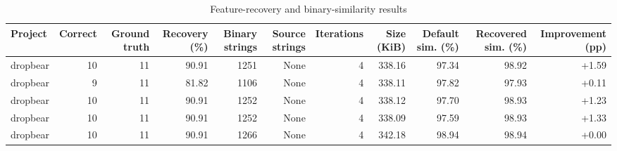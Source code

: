 \begin{table}[htbp]
\centering
\caption{Feature-recovery and binary-similarity results}
\label{tab:feature-recovery-results}
\small
\begin{tabular}{lrrrrrrrrrr}
\toprule
Project & Correct & Ground truth & Recovery (\%) & Binary strings & Source strings & Iterations & Size (KiB) & Default sim. (\%) & Recovered sim. (\%) & Improvement (pp) \\
\midrule
dropbear & 10 & 11 & 90.91 & 1251 & None & 4 & 338.16 & 97.34 & 98.92 & +1.59 \\
dropbear & 9 & 11 & 81.82 & 1106 & None & 4 & 338.11 & 97.82 & 97.93 & +0.11 \\
dropbear & 10 & 11 & 90.91 & 1252 & None & 4 & 338.12 & 97.70 & 98.93 & +1.23 \\
dropbear & 10 & 11 & 90.91 & 1252 & None & 4 & 338.09 & 97.59 & 98.93 & +1.33 \\
dropbear & 10 & 11 & 90.91 & 1266 & None & 4 & 342.18 & 98.94 & 98.94 & +0.00 \\
\bottomrule
\end{tabular}
\end{table}
